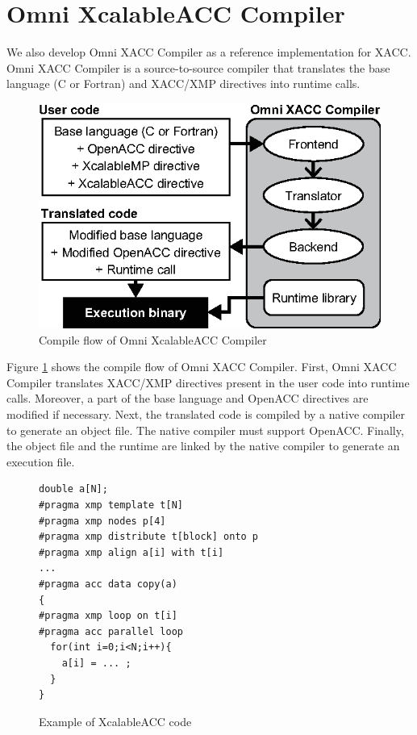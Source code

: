 \section{Omni XcalableACC Compiler}
We also develop Omni XACC Compiler as a reference implementation for XACC.
Omni XACC Compiler is a source-to-source compiler that translates the base language (C or Fortran) and XACC/XMP directives into runtime calls.

\begin{figure}[h]
\centering
\includegraphics[scale=0.94,clip]{figs/flow2.eps}
\caption{Compile flow of Omni XcalableACC Compiler}
\label{fig:flow}
\end{figure}

Figure \ref{fig:flow} shows the compile flow of Omni XACC Compiler.
First, 
Omni XACC Compiler translates XACC/XMP directives present in the user code into runtime calls. 
Moreover, a part of the base language and OpenACC directives are modified if necessary.
Next, the translated code is compiled by a native compiler to generate an object file.
The native compiler must support OpenACC.
Finally, the object file and the runtime are linked by the native compiler to generate an execution file.

\begin{figure}[!t]
\begin{center}
\begin{lstlisting}
double a[N];
#pragma xmp template t[N]
#pragma xmp nodes p[4]
#pragma xmp distribute t[block] onto p
#pragma xmp align a[i] with t[i]
...
#pragma acc data copy(a)
{
#pragma xmp loop on t[i]
#pragma acc parallel loop
  for(int i=0;i<N;i++){ 
    a[i] = ... ;
  }
}
\end{lstlisting}
\end{center} 
\caption{Example of XcalableACC code} \label{fig:program}
\end{figure}

